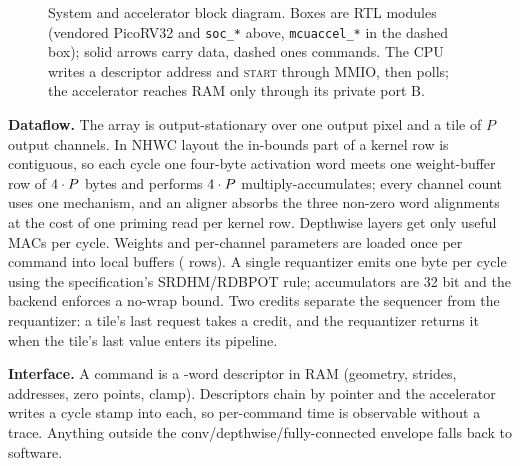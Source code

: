 \documentclass[conference]{IEEEtran}
\begin{document}
\begin{figure}[t]
\caption{System and accelerator block diagram. Boxes are RTL modules (vendored PicoRV32 and \texttt{soc\_*} above, \texttt{mcuaccel\_*} in the dashed box); solid arrows carry data, dashed ones commands. The CPU writes a descriptor address and \textsc{start} through MMIO, then polls; the accelerator reaches RAM only through its private port B.}\label{fig:sys}
\end{figure}

\textbf{Dataflow.} The array is output-stationary over one output pixel and a tile of $P$ output channels. In NHWC layout the in-bounds part of a kernel row is contiguous, so each cycle one four-byte activation word meets one weight-buffer row of $4\cdot P$ bytes and performs $4\cdot P$ multiply-accumulates; every channel count uses one mechanism, and an aligner absorbs the three non-zero word alignments at the cost of one priming read per kernel row. Depthwise layers get only \Lanes{} useful MACs per cycle. Weights and per-channel parameters are loaded once per command into local buffers (\WbufRows{} rows). A single requantizer emits one byte per cycle using the specification's SRDHM/RDBPOT rule; accumulators are 32 bit and the backend enforces a no-wrap bound. Two credits separate the sequencer from the requantizer: a tile's last request takes a credit, and the requantizer returns it when the tile's last value enters its pipeline.

\textbf{Interface.} A command is a \DescWords-word descriptor in RAM (geometry, strides, addresses, zero points, clamp). Descriptors chain by pointer and the accelerator writes a cycle stamp into each, so per-command time is observable without a trace. Anything outside the conv/depthwise/fully-connected envelope falls back to software.
\end{document}
